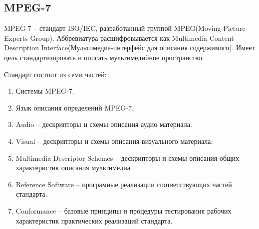 \begin{figure}[ht!]
\end{figure}

\subsection{ MPEG-7}
MPEG-7 -- стандарт ISO/IEC, разработанный группой MPEG(Moving Picture Experts Group). Аббревиатура расшифровывается как Multimedia Content Description Interface(Мультимедиа-интерфейс для описания содержимого). Имеет цель стандартизировать и описать мультимедийное пространство.

Стандарт состоит из семи частей:
\begin{enumerate}
	\item Системы MPEG-7.
	\item Язык описания определений MPEG-7.
	\item Audio -- дескрипторы и схемы описания аудио материала.
	\item Visual -- дескрипторы и схемы описания визуального материала.
	\item Multimedia Descriptor Schemes -- дескрипторы и схемы описания общих характеристик описания мультимедиа.
	\item Reference Software -- програмные реализации соответствующих частей стандарта.
	\item Conformance -- базовые принципы и процедуры тестирования рабочих характеристик практических реализаций стандарта.
\end{enumerate}

